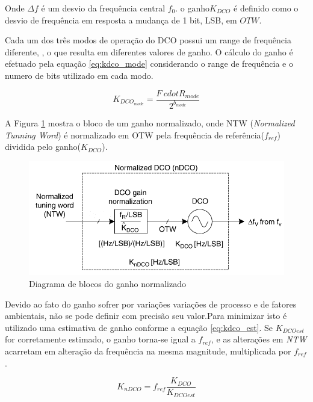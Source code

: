 Onde $\Delta f$ é um desvio da frequência central $f_0$. o ganho$K_{DCO}$ é definido como o desvio de frequência em resposta a mudança de 1 bit, LSB, em $OTW$. 

Cada um dos três modos de operação do DCO possui um range de frequência diferente, , o que resulta em diferentes valores de ganho.  O cálculo do ganho é efetuado pela equação \ref{eq:kdco_mode} considerando o range de frequência e o numero de bits utilizado em cada modo.




\begin{equation}
	K_{DCO_{mode}}= \frac{F \ cdot R_{mode}}{2^{b_{mode}}}
	\label{eq:kdco_mode}
\end{equation}

A Figura \ref{fig:ndco} mostra o bloco de um ganho normalizado, onde  NTW (\textit{Normalized Tunning Word}) é normalizado em OTW pela frequência de referência($f_{ref}$) dividida pelo ganho($	K_{DCO}$).

\begin{figure}[h!]
	\caption{Diagrama de blocos do ganho normalizado }
	\begin{center}
		\includegraphics[scale=0.8]{img/ndco.png}
	\end{center}
	\label{fig:ndco}
\end{figure}

Devido ao fato do ganho sofrer por variações variações de processo e de fatores ambientais, não se pode definir com precisão seu valor.Para minimizar isto é utilizado uma estimativa de ganho conforme a equação \ref{eq:kdco_est}. Se  $K_{DCOest}$ for corretamente estimado, o ganho torna-se igual a $f_{ref}$, e as alterações em \textit{NTW} acarretam em alteração da frequência na mesma magnitude, multiplicada por $f_{ref}$.

\begin{equation}
	K_{nDCO}=  f_{ref}\frac{K_{DCO}}{K_{DCOest}}
	\label{eq:kdco_est}
\end{equation}


